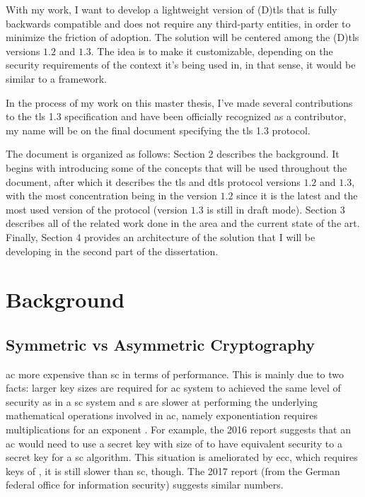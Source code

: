 \documentclass{llncs}
\begin{document}
With my work, I want to develop a lightweight version of (D)\gls{tls} that is
fully backwards compatible and does not require any third-party entities, in order
to minimize the friction of adoption. The solution will be centered among
the (D)\gls{tls} versions $1.2$ and $1.3$. The idea is to make it customizable,
depending on the security requirements of the context it's being used in, in that sense,
it would be similar to a framework.

In the process of my work on this master thesis, I've made several
contributions to the \gls{tls} 1.3 specification and have been officially
recognized as a contributor, my name will be on the final document specifying
the \gls{tls} 1.3 protocol.

The document is organized as follows: Section 2 describes the background. It
begins with introducing some of the concepts that will be used throughout
the document, after which it describes the \gls{tls} and \gls{dtls} protocol
versions $1.2$ and $1.3$, with the most concentration being in the version $1.2$ since
it is the latest and the most used version of the protocol (version $1.3$ is still in
draft mode). Section 3 describes all of the related work done in the area and
the current state of the art. Finally, Section 4 provides an architecture of the
solution that I will be developing in the second part of the dissertation.

\section{Background}

\subsection{Symmetric vs Asymmetric Cryptography}

\gls{ac} more expensive than \gls{sc} in terms of performance. This is mainly due
to two facts: larger key sizes are required for \gls{ac} system to achieved the
same level of security as in a \gls{sc} system  and s are slower at performing the underlying
mathematical operations involved in \gls{ac}, namely exponentiation requires
 multiplications for an exponent . For example,
the 2016  report \cite{Recommen44:online}
suggests that an \gls{ac} would need to use a secret key with size of 
to have equivalent security to a  secret key for a \gls{sc} algorithm.
This situation is ameliorated by \gls{ecc}, which requires keys of ,
it is still slower than \gls{sc}, though. The 2017  report \cite{Kryptogr1:online} (from the
German federal office for information security) suggests similar numbers.
\end{document}
